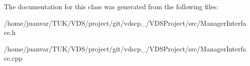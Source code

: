 The documentation for this class was generated from the following files\+:\begin{DoxyCompactItemize}
\item 
/home/juanvar/\+T\+U\+K/\+V\+D\+S/project/git/vdscp\+\_/\+V\+D\+S\+Project/src/Manager\+Interface.\+h\item 
/home/juanvar/\+T\+U\+K/\+V\+D\+S/project/git/vdscp\+\_/\+V\+D\+S\+Project/src/Manager\+Interface.\+cpp\end{DoxyCompactItemize}

